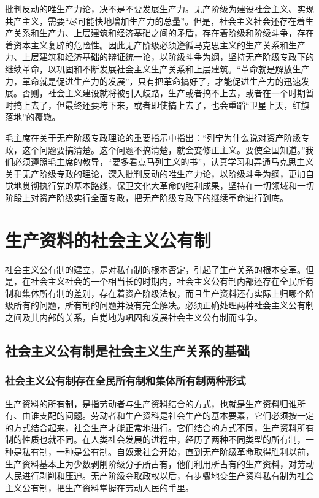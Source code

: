\documentclass{book}
\begin{document}
批判反动的唯生产力论，决不是不要发展生产力。无产阶级为建设社会主义、实现共产主义，需要“尽可能快地增加生产力的总量”。但是，社会主义社会还存在着生产关系和生产力、上层建筑和经济基础之间的矛盾，存在着阶级和阶级斗争，存在着资本主义复辟的危险性。因此无产阶级必须遵循马克思主义的生产关系和生产力、上层建筑和经济基础的辩证统一论，以阶级斗争为纲，坚持无产阶级专政下的继续革命，以巩固和不断发展社会主义生产关系和上层建筑。“革命就是解放生产力，革命就是促进生产力的发展”，只有把革命搞好了，才能促进生产力的迅速发展。否则，社会主义建设就将被引入歧路，生产或者搞不上去，或者在一个时期暂时搞上去了，但最终还要垮下来，或者即使搞上去了，也会重蹈“卫星上天，红旗落地”的覆辙。

毛主席在关于无产阶级专政理论的重要指示中指出：“列宁为什么说对资产阶级专政，这个问题要搞清楚。这个问题不搞清楚，就会变修正主义。要使全国知道。”我们必须遵照毛主席的教导，“要多看点马列主义的书”，认真学习和弄通马克思主义关于无产阶级专政的理论，深入批判反动的唯生产力论，以阶级斗争为纲，更加自觉地贯彻执行党的基本路线，保卫文化大革命的胜利成果，坚持在一切领域和一切阶段上对资产阶级实行全面专政，把无产阶级专政下的继续革命进行到底。

\chapter{生产资料的社会主义公有制}

社会主义公有制的建立，是对私有制的根本否定，引起了生产关系的根本变革。但是，在社会主义社会的一个相当长的时期内，社会主义公有制内部还存在全民所有制和集体所有制的差别，存在着资产阶级法权，而且生产资料还有实际上归哪个阶级所有的问题，所有制的问题并没有完全解决。必须正确处理两种社会主义公有制之间及其内部的关系，自觉地为巩固和发展社会主义公有制而斗争。

\section{社会主义公有制是社会主义生产关系的基础}

\subsection{社会主义公有制存在全民所有制和集体所有制两种形式}

生产资料的所有制，是指劳动者与生产资料结合的方式，也就是生产资料归谁所有、由谁支配的问题。劳动者和生产资科是社会生产的基本要素，它们必须按一定的方式结合起来，社会生产才能正常地进行。它们结合的方式不同，生产资料所有制的性质也就不同。在人类社会发展的进程中，经历了两种不同类型的所有制，一种是私有制，一种是公有制。自奴隶社会开始，直到无产阶级革命取得胜利以前，生产资料基本上为少数剥削阶级分子所占有，他们利用所占有的生产资料，对劳动人民进行剥削和压迫。无产阶级夺取政权以后，有步骤地变生产资料私有制为社会主义公有制，把生产资料掌握在劳动人民的手里。
\end{document}
